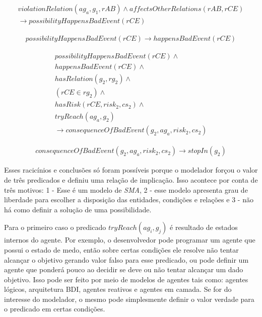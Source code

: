 \begin{eqnarray}
	violationRelation(ag_a,g_1,rAB)  \wedge affectsOtherRelations(rAB,rCE) \nonumber \\
    \to possibilityHappensBadEvent(rCE)  
\end{eqnarray}


\begin{eqnarray}
	possibilityHappensBadEvent(rCE) \to happensBadEvent(rCE) 
\end{eqnarray}



\begin{eqnarray}\label{paybutiamnotguilty}
	possibilityHappensBadEvent(rCE) \wedge  \nonumber \\
    happensBadEvent(rCE) \wedge  \nonumber \\
    hasRelation(g_2,rg_2) \wedge  \nonumber \\
    (rCE \in rg_2) \nonumber \wedge  \nonumber \\
    hasRisk(rCE,risk_2,cs_2) \wedge  \nonumber \\
    tryReach(ag_a,g_2) \nonumber  \nonumber \\
	\to consequenceOfBadEvent(g_2,ag_a,risk_2,cs_2) 
\end{eqnarray}


\begin{eqnarray}\label{badcons}
	consequenceOfBadEvent(g_2,ag_a,risk_2,cs_2) \to stopIn(g_2) 
\end{eqnarray}


Esses racicínios e conclusões só foram possíveis porque o modelador forçou o valor de três predicados e definiu uma relação de implicação. 
Isso acontece por conta de três motivos: 1 - Esse é um modelo de \textit{SMA}, 2 - esse modelo apresenta grau de liberdade para escolher 
a disposição das entidades, condições e relações e 3 - não há como definir a solução de uma possibilidade. 

Para o primeiro caso o predicado $tryReach(ag_i,g_j)$ é resultado de estados internos do agente. Por exemplo, o desenvolvedor pode 
programar um agente que possui o estado de medo, então sobre certas condições ele resolve não tentar alcançar o objetivo gerando 
valor falso para esse predicado, ou pode definir um agente que ponderá pouco ao decidir se deve ou não tentar alcançar um dado objetivo. 
Isso pode ser feito por meio de modelos de agentes tais como: agentes lógicos, arquitetura BDI, 
agentes reativos e agentes em camada. Se for do interesse do modelador, o mesmo pode simplesmente definir o valor verdade para o 
predicado em certas condições. 

